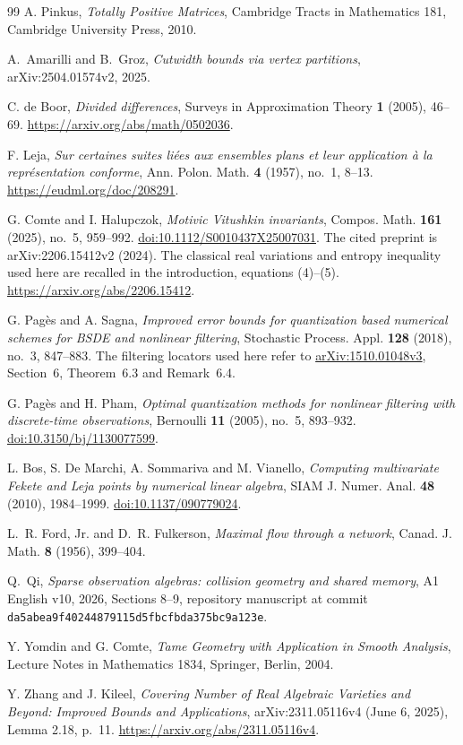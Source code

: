 \begin{thebibliography}{99}
A. Pinkus, \emph{Totally Positive Matrices}, Cambridge Tracts in
Mathematics 181, Cambridge University Press, 2010.

A.~Amarilli and B.~Groz,
\emph{Cutwidth bounds via vertex partitions},
arXiv:2504.01574v2, 2025.

C. de Boor, \emph{Divided differences}, Surveys in Approximation Theory
\textbf{1} (2005), 46--69. \url{https://arxiv.org/abs/math/0502036}.

F. Leja, \emph{Sur certaines suites li\'ees aux ensembles plans et leur
application \`a la repr\'esentation conforme}, Ann. Polon. Math.
\textbf{4} (1957), no.~1, 8--13.
\url{https://eudml.org/doc/208291}.

G. Comte and I. Halupczok, \emph{Motivic Vitushkin invariants},
Compos. Math. \textbf{161} (2025), no.~5, 959--992.
\href{https://doi.org/10.1112/S0010437X25007031}{doi:10.1112/S0010437X25007031}.
The cited preprint is arXiv:2206.15412v2 (2024). The classical real variations and entropy
inequality used here are recalled in the introduction, equations (4)--(5).
\url{https://arxiv.org/abs/2206.15412}.

G. Pag\`es and A. Sagna, \emph{Improved error bounds for quantization
based numerical schemes for BSDE and nonlinear filtering},
Stochastic Process. Appl. \textbf{128} (2018), no.~3, 847--883.
The filtering locators used here refer to
\href{https://arxiv.org/abs/1510.01048v3}{arXiv:1510.01048v3},
Section~6, Theorem~6.3 and Remark~6.4.

G. Pag\`es and H. Pham, \emph{Optimal quantization methods for nonlinear
filtering with discrete-time observations}, Bernoulli \textbf{11}
(2005), no.~5, 893--932.
\href{https://doi.org/10.3150/bj/1130077599}{doi:10.3150/bj/1130077599}.

L. Bos, S. De Marchi, A. Sommariva and M. Vianello,
\emph{Computing multivariate Fekete and Leja points by numerical linear
algebra}, SIAM J. Numer. Anal. \textbf{48} (2010), 1984--1999.
\href{https://doi.org/10.1137/090779024}{doi:10.1137/090779024}.

L.~R. Ford, Jr. and D.~R. Fulkerson,
\emph{Maximal flow through a network},
Canad. J. Math. \textbf{8} (1956), 399--404.

Q.~Qi,
\emph{Sparse observation algebras: collision geometry and shared memory},
A1 English v10, 2026, Sections 8--9,
repository manuscript at commit
\texttt{da5abea9f40244879115d5fbcfbda375bc9a123e}.

Y. Yomdin and G. Comte, \emph{Tame Geometry with Application in Smooth
Analysis}, Lecture Notes in Mathematics 1834, Springer, Berlin, 2004.

Y. Zhang and J. Kileel, \emph{Covering Number of Real Algebraic Varieties
and Beyond: Improved Bounds and Applications}, arXiv:2311.05116v4 (June 6, 2025),
Lemma 2.18, p.~11. \url{https://arxiv.org/abs/2311.05116v4}.
\end{thebibliography}
